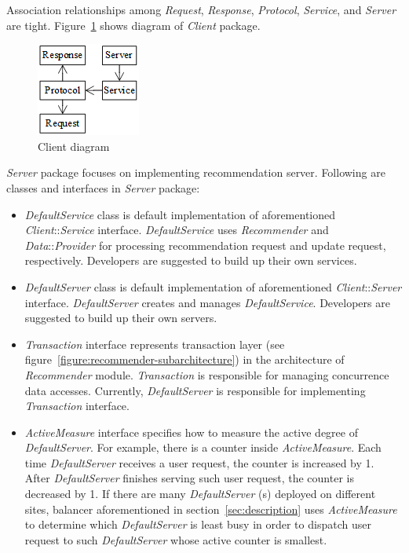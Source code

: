 \documentclass[a4paper,twoside]{article}
\begin{document}
Association relationships among \textit{Request}, \textit{Response}, \textit{Protocol}, \textit{Service}, and \textit{Server} are tight. Figure~\ref{figure:client-diagram} shows diagram of \textit{Client} package.
\begin{figure}
\centering
\includegraphics{ClientDiagram.png}
\caption{Client diagram}
\label{figure:client-diagram}
\end{figure}

\textit{Server} package focuses on implementing recommendation server. Following are classes and interfaces in \textit{Server} package:
\begin{itemize}
\item \textit{DefaultService} class is default implementation of aforementioned \textit{Client}::\textit{Service} interface. \textit{DefaultService} uses \textit{Recommender} and \textit{Data}::\textit{Provider} for processing recommendation request and update request, respectively. Developers are suggested to build up their own services.

\item \textit{DefaultServer} class is default implementation of aforementioned \textit{Client}::\textit{Server} interface. \textit{DefaultServer} creates and manages \textit{DefaultService}. Developers are suggested to build up their own servers.

\item \textit{Transaction} interface represents transaction layer (see figure~\ref{figure:recommender-subarchitecture}) in the architecture of \textit{Recommender} module. \textit{Transaction} is responsible for managing concurrence data accesses. Currently, \textit{DefaultServer} is responsible for implementing \textit{Transaction} interface.

\item \textit{ActiveMeasure} interface specifies how to measure the active degree of \textit{DefaultServer}. For example, there is a counter inside \textit{ActiveMeasure}. Each time \textit{DefaultServer} receives a user request, the counter is increased by 1. After \textit{DefaultServer} finishes serving such user request, the counter is decreased by 1. If there are many \textit{DefaultServer} (s) deployed on different sites, balancer aforementioned in section~\ref{sec:description} uses \textit{ActiveMeasure} to determine which \textit{DefaultServer} is least busy in order to dispatch user request to such \textit{DefaultServer} whose active counter is smallest.
\end{itemize}
\end{document}

